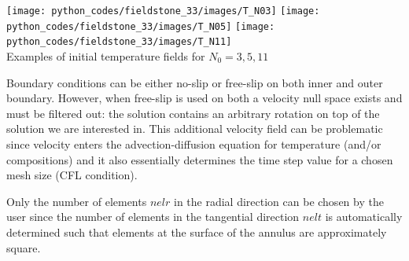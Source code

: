 \begin{center}
\texttt{[image: python\_codes/fieldstone\_33/images/T\_N03]}
\texttt{[image: python\_codes/fieldstone\_33/images/T\_N05]}
\texttt{[image: python\_codes/fieldstone\_33/images/T\_N11]}\\
{\captionfont Examples of initial temperature fields for $N_0=3,5,11$}
\end{center}

Boundary conditions can be either no-slip or free-slip on both inner and outer boundary. 
However, when free-slip is used on both a velocity null space exists and must be filtered out:
the solution contains an arbitrary rotation on top of the solution we are interested in.
This additional velocity field can be problematic since velocity enters the advection-diffusion 
equation for temperature (and/or compositions)
and it also essentially determines the time step value for a chosen mesh size (CFL condition).

Only the number of elements $nelr$ in the radial direction can be chosen by the user
since the number of elements in the tangential direction $nelt$ is automatically determined
such that elements at the surface of the annulus are approximately square.

